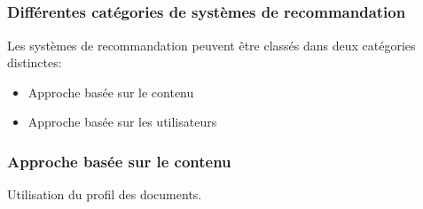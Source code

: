 \documentclass{beamer}
\begin{document}
        \subsection{}
            \begin{frame}
                \frametitle{Différentes catégories de systèmes de recommandation}
                Les systèmes de recommandation peuvent être classés dans deux catégories distinctes:
                \pause
                \begin{itemize}
                    \item Approche basée sur le contenu
                    \pause
                    \item Approche basée sur les utilisateurs
                \end{itemize}
            \end{frame}
            \begin{frame}
                \frametitle{Approche basée sur le contenu}
                    Utilisation du profil des documents.
                    \pause[2]
                    \pause[5]
            \end{frame}
\end{document}
